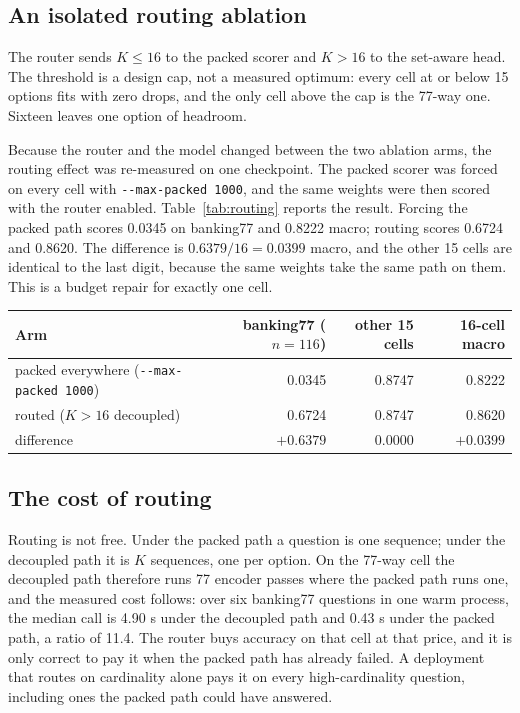 \subsection{An isolated routing ablation}
The router sends $K\le16$ to the packed scorer and $K>16$ to the set-aware head. The threshold is
a design cap, not a measured optimum: every cell at or below 15 options fits with zero drops, and
the only cell above the cap is the 77-way one. Sixteen leaves one option of headroom.

Because the router and the model changed between the two ablation arms, the routing
effect was re-measured on one checkpoint. The packed scorer was forced on every cell with
\texttt{-{}-max-packed 1000}, and the same weights were then scored with the router enabled.
Table~\ref{tab:routing} reports the result. Forcing the packed path scores 0.0345 on banking77
and 0.8222 macro; routing scores 0.6724 and 0.8620. The difference is $0.6379/16=0.0399$ macro,
and the other 15 cells are identical to the last digit, because the same weights take the same
path on them. This is a budget repair for exactly one cell.

\begin{widetable}
\centering
\footnotesize
\caption{The routing ablation on one checkpoint, same weights, same rows, same decoding. Only the
packed/decoupled switch changes. Every cell except banking77 is identical, so the macro difference
is one cell divided by sixteen.}
\label{tab:routing}
\begin{tabular}{lrrr}
\toprule
Arm & banking77 ($n=116$) & other 15 cells & 16-cell macro \\
\midrule
packed everywhere (\texttt{-{}-max-packed 1000}) & 0.0345 & 0.8747 & 0.8222 \\
routed ($K>16$ decoupled) & 0.6724 & 0.8747 & 0.8620 \\
\midrule
difference & $+0.6379$ & $0.0000$ & $+0.0399$ \\
\bottomrule
\end{tabular}
\end{widetable}

\subsection{The cost of routing}
Routing is not free. Under the packed path a question is one sequence; under the decoupled path it
is $K$ sequences, one per option. On the 77-way cell the decoupled path therefore runs 77 encoder
passes where the packed path runs one, and the measured cost follows: over six banking77
questions in one warm process, the median call is 4.90 s under the decoupled path and 0.43 s
under the packed path, a ratio of 11.4. The router buys accuracy on that cell at that price, and it is only
correct to pay it when the packed path has already failed. A deployment that routes on
cardinality alone pays it on every high-cardinality question, including ones the packed path
could have answered.


